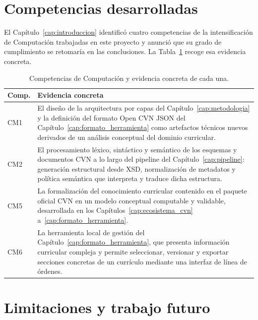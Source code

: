\section{Competencias desarrolladas}
\label{sec:conclusiones_competencias}

El Capítulo~\ref{cap:introduccion} identificó cuatro competencias de la
intensificación de Computación trabajadas en este proyecto y anunció que su
grado de cumplimiento se retomaría en las conclusiones. La
Tabla~\ref{tab:conclusiones_competencias} recoge esa evidencia concreta.

\begin{table}[htbp]
  \centering
  \footnotesize
  \renewcommand{\arraystretch}{1.55}
  \caption{Competencias de Computación y evidencia concreta de cada una.}
  \label{tab:conclusiones_competencias}
  \begin{tabular}{p{} p{}}
    \hline
    \textbf{Comp.} & \textbf{Evidencia concreta} \\
    \hline
    CM1 & El diseño de la arquitectura por capas del
    Capítulo~\ref{cap:metodologia} y la definición del formato Open CVN JSON
    del Capítulo~\ref{cap:formato_herramienta} como artefactos técnicos
    nuevos derivados de un análisis conceptual del dominio curricular. \\
    CM2 & El procesamiento léxico, sintáctico y semántico de los esquemas y
    documentos CVN a lo largo del pipeline del
    Capítulo~\ref{cap:pipeline}: generación estructural desde XSD,
    normalización de metadatos y política semántica que interpreta
    y traduce dicha estructura. \\
    CM5 & La formalización del conocimiento curricular contenido en el
    paquete oficial CVN en un modelo conceptual computable y validable,
    desarrollada en los Capítulos~\ref{cap:ecosistema_cvn}
    a~\ref{cap:formato_herramienta}. \\
    CM6 & La herramienta local de gestión del
    Capítulo~\ref{cap:formato_herramienta}, que presenta información
    curricular compleja y permite seleccionar, versionar y exportar
    secciones concretas de un currículo mediante una interfaz de línea de
    órdenes. \\
    \hline
  \end{tabular}
\end{table}

\section{Limitaciones y trabajo futuro}
\label{sec:conclusiones_limitaciones}


